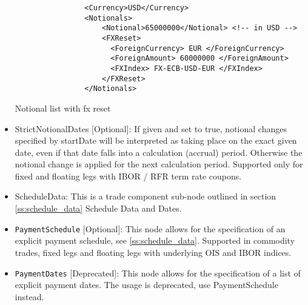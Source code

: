\begin{itemize}
 \begin{listing}[H]
\begin{verbatim}
                <Currency>USD</Currency>
                <Notionals>
                    <Notional>65000000</Notional> <!-- in USD -->
                    <FXReset>
                      <ForeignCurrency> EUR </ForeignCurrency>
                      <ForeignAmount> 60000000 </ForeignAmount>
                      <FXIndex> FX-ECB-USD-EUR </FXIndex>
                    </FXReset>
                </Notionals>
\end{verbatim}
\caption{Notional list with fx reset}
\label{lst:notional_fxreset}
\end{listing}

\item StrictNotionalDates [Optional]: If given and set to true, notional changes specified by startDate will be
  interpreted as taking place on the exact given date, even if that date falls into a calculation (accrual)
  period. Otherwise the notional change is applied for the next calculation period. Supported only for fixed and
  floating legs with IBOR / RFR term rate coupons.
\item ScheduleData: This is a trade component sub-node outlined in section \ref{ss:schedule_data} Schedule Data and
  Dates.
\item \lstinline!PaymentSchedule! [Optional]: This node allows for the specification of an explicit payment schedule,
  see \ref{ss:schedule_data}. Supported in commodity trades, fixed legs and floating legs with underlying OIS and IBOR
  indices.
\item \lstinline!PaymentDates! [Deprecated]: This node allows for the specification of a list of explicit payment
  dates. The usage is deprecated, use PaymentSchedule instead.


\end{itemize}
